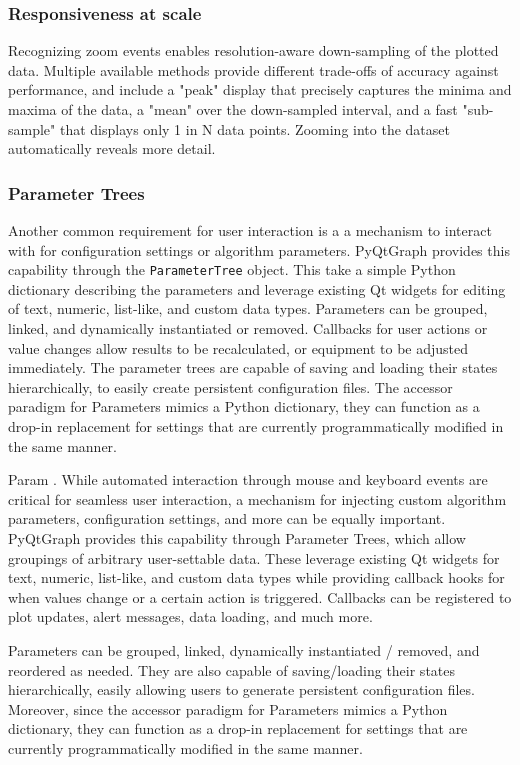 \documentclass[journal]{vgtc}                %
\begin{document}
\subsubsection{Responsiveness at scale}

Recognizing zoom events enables resolution-aware down-sampling of the plotted data. Multiple available methods provide different trade-offs of accuracy against performance, and include a "peak" display that precisely captures the minima and maxima of the data, a "mean" over the down-sampled interval, and a fast "sub-sample" that displays only 1 in N data points. \color{DarkOrchid} Zooming into the dataset automatically reveals more detail.

\subsubsection{Parameter Trees}\label{sec:paramtrees}
\color{DarkOrchid}
Another common requirement for user interaction is a a mechanism to interact with for configuration settings or algorithm parameters. PyQtGraph provides this capability through the \texttt{ParameterTree} object. This take a simple Python dictionary describing the parameters and leverage existing Qt widgets for editing of text, numeric, list-like, and custom data types. Parameters can be grouped, linked, and dynamically instantiated or removed. Callbacks for user actions or value changes allow results to be recalculated, or equipment to be adjusted immediately. The parameter trees are capable of saving and loading their states hierarchically, to easily create persistent configuration files. The accessor paradigm for Parameters mimics a Python dictionary, they can function as a drop-in replacement for settings that are currently programmatically modified in the same manner.

Param
.
\color{brown}
While automated interaction through mouse and keyboard events are critical for seamless user interaction, a mechanism for injecting custom algorithm parameters, configuration settings, and more can be equally important. PyQtGraph provides this capability through Parameter Trees, which allow groupings of arbitrary user-settable data. These leverage existing Qt widgets for text, numeric, list-like, and custom data types while providing callback hooks for when values change or a certain action is triggered. Callbacks can be registered to plot updates, alert messages, data loading, and much more.


Parameters can be grouped, linked, dynamically instantiated / removed, and reordered as needed. They are also capable of saving/loading their states hierarchically, easily allowing users to generate persistent configuration files. Moreover, since the accessor paradigm for Parameters mimics a Python dictionary, they can function as a drop-in replacement for settings that are currently programmatically modified in the same manner.
\end{document}
